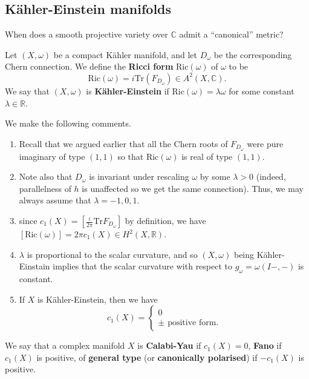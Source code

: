 \documentclass[11pt]{amsart}
\newcommand{\tbf}[1]{\textbf{#1}}
\newcommand{\Tr}{\text{Tr}}
\newcommand{\R}{\mathbb R}
\newcommand{\C}{\mathbb C}
\theoremstyle{definition}
\numberwithin{equation}{section}
\begin{document}
\subsection{Kähler-Einstein manifolds}
\begin{question}
	When does a smooth projective variety over $\C$ admit a ``canonical'' metric?
\end{question}
\begin{definition}
	Let $(X,\omega)$ be a compact Kähler manifold, and let $D_\omega$ be the corresponding Chern connection. We define the \tbf{Ricci form} $\text{Ric}(\omega)$ of $\omega$ to be
	\[
	\text{Ric}(\omega)=i\Tr(F_{D_\omega})\in A^2(X,\C).
	\]
	We say that $(X,\omega)$ is \tbf{Kähler-Einstein} if $\text{Ric}(\omega)=\lambda\omega$ for some constant $\lambda\in \R$. 
\end{definition}
\begin{remark} We make the following comments.
\begin{enumerate}
	\item  Recall that we argued earlier that all the Chern roots of $F_{D_\omega}$ were pure imaginary of type $(1,1)$ so that $\text{Ric}(\omega)$ is real of type $(1,1)$. 
	
	\item Note also that $D_\omega$ is invariant under rescaling $\omega$ by some $\lambda>0$ (indeed, parallelness of $h$ is unaffected so we get the same connection). Thus, we may always assume that $\lambda=-1,0,1$.
	
	\item since $c_1(X)=[\frac{\iota}{2\pi}\Tr F_{D_\omega}]$ by definition, we have $[\text{Ric}(\omega)]=2\pi c_1(X)\in H^2(X,\R)$.
	\item $\lambda$ is proportional to the scalar curvature, and so $(X,\omega)$ being Kähler-Einstain implies that the scalar curvature with respect to $g_\omega=\omega(I-,-)$ is constant.
	\item If $X$ is Kähler-Einstein, then we have
	\[
	c_1(X)=\begin{cases}
		0\\
		\pm\text{ positive form}.
	\end{cases}
	\]
\end{enumerate}	
\end{remark}
\begin{definition}
	We say that a complex manifold $X$ is \tbf{Calabi-Yau} if $c_1(X)=0$, \tbf{Fano} if $c_1(X)$ is positive, of \tbf{general type} (or \tbf{canonically polarised}) if $-c_1(X)$ is positive.
\end{definition}
\end{document}
